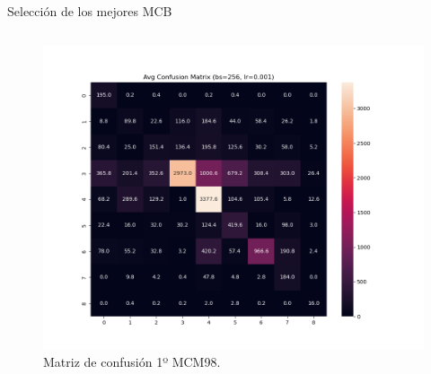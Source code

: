 \begin{frame}{Selección de los mejores MCB}
\begin{columns}[b]
\begin{column}{0.3\textwidth}
\begin{figure}[H]
    \centering
    \includegraphics[width=1\textwidth]{../Memoria/img/modelo/matrices_confusion/MC_ENT_MCM98.png}
    \caption{Matriz de confusión 1º MCM98.}
    \label{fig:MC_ENT_MCM98}
\end{figure}

\end{column}
\end{columns}
\end{frame}


